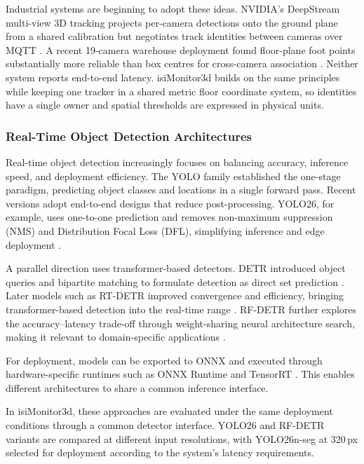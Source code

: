 \documentclass[9pt,a4paper,twocolumn]{rho-class/rho}
\begin{document}
Industrial systems are beginning to adopt these ideas. NVIDIA's DeepStream multi-view 3D tracking projects per-camera detections onto the ground plane from a shared calibration but negotiates track identities between cameras over MQTT \cite{nvidia2026mv3dt}. A recent 19-camera warehouse deployment found floor-plane foot points substantially more reliable than box centres for cross-camera association \cite{mori2025warehouse}. Neither system reports end-to-end latency. isiMonitor3d builds on the same principles while keeping one tracker in a shared metric floor coordinate system, so identities have a single owner and spatial thresholds are expressed in physical units.

\subsubsection{Real-Time Object Detection Architectures}

Real-time object detection increasingly focuses on balancing accuracy, inference speed, and deployment efficiency. The YOLO family established the one-stage paradigm, predicting object classes and locations in a single forward pass. Recent versions adopt end-to-end designs that reduce post-processing. YOLO26, for example, uses one-to-one prediction and removes non-maximum suppression (NMS) and Distribution Focal Loss (DFL), simplifying inference and edge deployment \cite{jocher2026yolo26}.

A parallel direction uses transformer-based detectors. DETR introduced object queries and bipartite matching to formulate detection as direct set prediction \cite{carion2020detr}. Later models such as RT-DETR improved convergence and efficiency, bringing transformer-based detection into the real-time range \cite{zhao2024rtdetr}. RF-DETR further explores the accuracy--latency trade-off through weight-sharing neural architecture search, making it relevant to domain-specific applications \cite{robinson2025rfdetr}.

For deployment, models can be exported to ONNX and executed through hardware-specific runtimes such as ONNX Runtime and TensorRT \cite{onnxruntime}. This enables different architectures to share a common inference interface.

In isiMonitor3d, these approaches are evaluated under the same deployment conditions through a common detector interface. YOLO26 and RF-DETR variants are compared at different input resolutions, with YOLO26n-seg at 320\,px selected for deployment according to the system's latency requirements.
\end{document}
